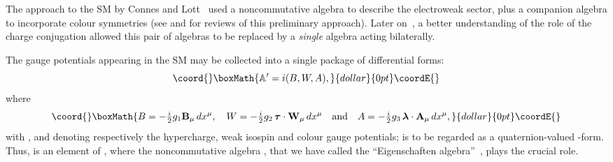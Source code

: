 \documentclass[a4paper,12pt]{article}
\providecommand{\A}{\mathcal{A}}        %
\renewcommand{\AA}{\mathbb{A}}      %
\providecommand{\C}{\mathbb{C}}         %
\providecommand{\HH}{\mathbb{H}}        %
\providecommand{\La}{\Lambda}           %
\providecommand{\lab}{\boldsymbol{\lambda}} %
\providecommand{\ox}{\otimes}           %
\providecommand{\taub}{\boldsymbol{\tau}} %
\providecommand{\tihalf}{\tfrac{i}{2}}  %
\providecommand{\1}{\mathbf{1}}         %
\providecommand{\7}{\dagger}            %
\providecommand{\8}{\bullet}            %
\renewcommand{\.}{\cdot}            %
\renewcommand{\:}{\colon}           %
\begin{document}
The approach to the SM by Connes and Lott~\cite{ConnesL} used a
noncommutative algebra to describe the electroweak sector, plus a
companion algebra to incorporate colour symmetries (see \cite{Sirius}
and \cite{KastlerS} for reviews of this preliminary approach). Later
on~\cite{ConnesReal}, a better understanding of the role of the charge
conjugation allowed this pair of algebras to be replaced by a
\textit{single} algebra acting bilaterally.

The gauge potentials appearing in the SM may be collected into a
single package of differential forms:
$$\coord{}\boxMath{
\AA' = i(B,W,A),
}{dollar}{0pt}\coordE{}$$
where
$$\coord{}\boxMath{
B = -\tihalf g_1 \mathbf{B}_\mu \,dx^\mu, \quad
W = -\tihalf g_2\,\taub \cdot \mathbf{W}_\mu \,dx^\mu
\quad{\rm and}
\quad A = -\tihalf g_3\,\lab \cdot \mathbf{A}_\mu\,dx^\mu,
}{dollar}{0pt}\coordE{}$$
with \coordHE{}, \coordHE{} and \coordHE{} denoting respectively
the hypercharge, weak isospin and colour gauge potentials; \coordHE{} is to
be regarded as a quaternion-valued \coordHE{}-form. Thus, \myHighlight{$\AA'$}\coordHE{} is an
element of \myHighlight{$\La^1(M) \ox \A_F$}\coordHE{}, where the noncommutative algebra
\myHighlight{$\A_F := \C \oplus \HH \oplus M_3(\C)$}\coordHE{}, that we have called the
``Eigenschaften algebra''~\cite{Cordelia}, plays the crucial role.
\end{document}
